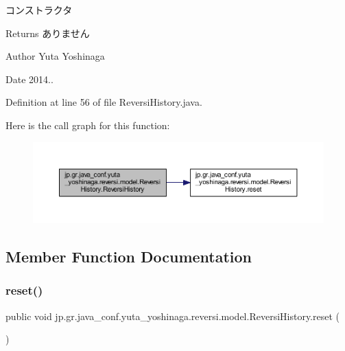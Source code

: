 コンストラクタ 

\begin{DoxyReturn}{Returns}
ありません 
\end{DoxyReturn}
\begin{DoxyAuthor}{Author}
Yuta Yoshinaga 
\end{DoxyAuthor}
\begin{DoxyDate}{Date}
2014.. 
\end{DoxyDate}


Definition at line 56 of file Reversi\+History.\+java.

Here is the call graph for this function\+:
\nopagebreak
\begin{figure}[H]
\begin{center}
\leavevmode
\includegraphics[width=350pt]{classjp_1_1gr_1_1java__conf_1_1yuta__yoshinaga_1_1reversi_1_1model_1_1_reversi_history_abd0f556489e10b58555304449c6c2682_cgraph}
\end{center}
\end{figure}


\subsection{Member Function Documentation}
\mbox{\label{classjp_1_1gr_1_1java__conf_1_1yuta__yoshinaga_1_1reversi_1_1model_1_1_reversi_history_aee0155159a017671c2b18c1d8229d8d1}} 
\subsubsection{\texorpdfstring{reset()}{reset()}}
{\footnotesize\ttfamily public void jp.\+gr.\+java\+\_\+conf.\+yuta\+\_\+yoshinaga.\+reversi.\+model.\+Reversi\+History.\+reset (\begin{DoxyParamCaption}{ }\end{DoxyParamCaption})}



